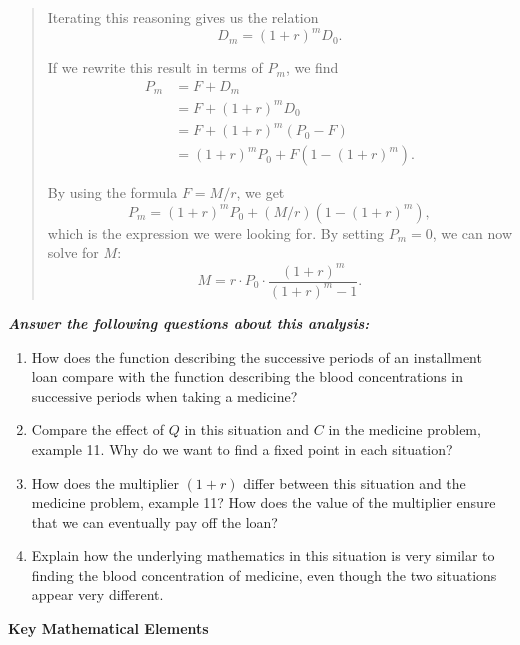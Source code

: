 {\begin{quote}
      Iterating this reasoning gives us the relation
      $$
        D_m = (1 + r)^m D_0.
      $$

      If we rewrite this result in terms of $P_m$, we find
      \begin{align*}
        P_m
          &=F+D_m \\
          &=F+(1+r)^mD_0 \\
          &=F+(1+r)^m(P_0-F) \\
          &=(1+r)^mP_0+F\left(1-(1+r)^m\right).
      \end{align*}

      By using the formula $F = M/r$, we get
      $$
        P_m=(1+r)^mP_0+(M/r)\left(1-(1+r)^m\right),
      $$
      which is the expression we were looking for. By setting $P_m = 0$, we can now solve for $M$:
      $$
        M=r\cdot P_0\cdot \frac{(1+r)^m}{(1+r)^m-1}.
      $$
    \end{quote}\vspace{.35\baselineskip}

    \textbf{\emph{Answer the following questions about this analysis:}}

    \begin{enumerate}
      \item How does the function describing the successive periods of an installment loan compare with the function describing the blood concentrations in successive periods when taking a medicine?
      
      \item Compare the effect of $Q$ in this situation and $C$ in the medicine problem, example 11. Why do we want to find a fixed point in each situation?\vspace{\baselineskip}
      
      \item How does the multiplier $(1 + r)$ differ between this situation and the medicine problem, example 11? How does the value of the multiplier ensure that we can eventually pay off the loan?
      
      \item Explain how the underlying mathematics in this situation is very similar to finding the blood concentration of medicine, even though the two situations appear very different. 
    \end{enumerate}

    \textbf{Key Mathematical Elements}

    \begin{hanglist}


\end{hanglist}}
